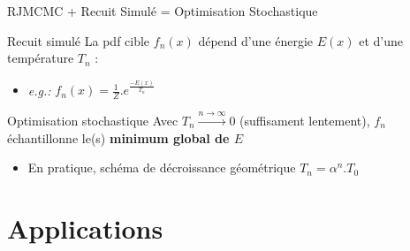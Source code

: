 \documentclass{beamer}
\begin{document}
\begin{frame}{RJMCMC + Recuit Simulé = Optimisation Stochastique}

\begin{block}{Recuit simulé}
La pdf cible $f_n(x)$ dépend d'une énergie $E(x)$ et d'une température $T_n$ :
\begin{itemize}
\item \textit{e.g.:} $f_n(x) = \frac{1}{Z}.e^\frac{-E(x)}{T_n}$
\end{itemize}
\end{block}

\begin{block}{Optimisation stochastique }
Avec $T_n\overset{n\rightarrow\infty}{\longrightarrow} 0$ (suffisament lentement), $f_n$ échantillonne le(s) \textbf{minimum global de $E$} 
\begin{itemize}
\item En pratique, schéma de décroissance géométrique $T_n=\alpha^n.T_0$
\end{itemize}
\end{block}

\end{frame}



\section{Applications}
\end{document}
